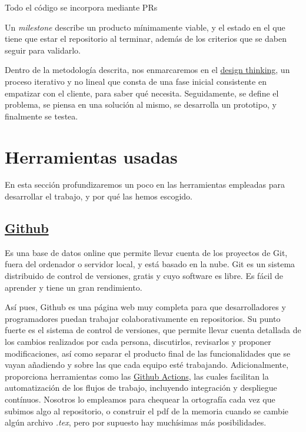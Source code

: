 Todo el código se incorpora mediante PRs

Un \textit{milestone} describe un producto mínimamente viable, y el estado en el que tiene 
que estar el repositorio al terminar, además de los criterios que se daben seguir 
para validarlo.

Dentro de la metodología descrita, nos enmarcaremos en el \href{https://www.iebschool.com/blog/design-thinking-agile-scrum/}{design thinking}, 
un proceso iterativo y no lineal que consta de una fase inicial consistente en empatizar con el 
cliente, para saber qué necesita. Seguidamente, se define el problema, se piensa en una solución al 
mismo, se desarrolla un prototipo, y finalmente se testea. 


\section{Herramientas usadas}
En esta sección profundizaremos un poco en las herramientas empleadas para desarrollar el trabajo, 
y por qué las hemos escogido.
\subsection{\href{https://github.com/}{Github}} 

Es una base de datos online que permite llevar cuenta de los proyectos de Git, fuera del ordenador o 
servidor local, y está basado en la nube. Git es un sistema distribuido de control de versiones, gratis y 
cuyo software es libre. Es fácil de aprender y tiene un gran rendimiento.

Así pues, Github es una página web muy completa para que desarrolladores y programadores puedan trabajar colaborativamente 
en repositorios. Su punto fuerte es el sistema de control de versiones, que permite llevar cuenta detallada 
de los cambios realizados por cada persona, discutirlos, revisarlos y proponer modificaciones, así como 
separar el producto final de las funcionalidades que se vayan añadiendo y sobre las que cada equipo esté 
trabajando. Adicionalmente, proporciona herramientas como las \href{https://github.com/features/actions}{Github Actions}, 
las cuales facilitan la automatización de los flujos de trabajo, incluyendo integración y despliegue contínuos.
Nosotros lo empleamos para chequear la ortografía cada vez que subimos algo al repositorio, o construir el pdf 
de la memoria cuando se cambie algún archivo \textit{.tex}, pero por supuesto hay muchísimas más posibilidades.


